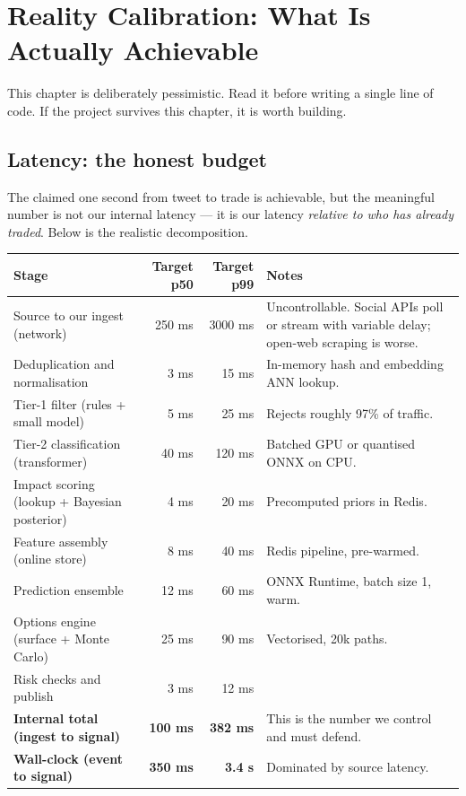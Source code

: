 \chapter{Reality Calibration: What Is Actually Achievable}
\label{ch:reality}

This chapter is deliberately pessimistic. Read it before writing a single line
of code. If the project survives this chapter, it is worth building.

\section{Latency: the honest budget}

The claimed one second from tweet to trade is achievable, but the meaningful
number is not our internal latency --- it is our latency \emph{relative to who
has already traded}. Below is the realistic decomposition.

\begin{longtable}{@{}p{5.4cm}rrp{5.0cm}@{}}
\toprule
\textbf{Stage} & \textbf{Target p50} & \textbf{Target p99} & \textbf{Notes}\\
\midrule
Source to our ingest (network) & 250 ms & 3000 ms & Uncontrollable. Social APIs
poll or stream with variable delay; open-web scraping is worse.\\
Deduplication and normalisation & 3 ms & 15 ms & In-memory hash and embedding
ANN lookup.\\
Tier-1 filter (rules + small model) & 5 ms & 25 ms & Rejects roughly 97\% of
traffic.\\
Tier-2 classification (transformer) & 40 ms & 120 ms & Batched GPU or quantised
ONNX on CPU.\\
Impact scoring (lookup + Bayesian posterior) & 4 ms & 20 ms & Precomputed
priors in Redis.\\
Feature assembly (online store) & 8 ms & 40 ms & Redis pipeline, pre-warmed.\\
Prediction ensemble & 12 ms & 60 ms & ONNX Runtime, batch size 1, warm.\\
Options engine (surface + Monte Carlo) & 25 ms & 90 ms & Vectorised, 20k paths.\\
Risk checks and publish & 3 ms & 12 ms & \\
\midrule
\textbf{Internal total (ingest to signal)} & \textbf{100 ms} & \textbf{382 ms}
& This is the number we control and must defend.\\
\textbf{Wall-clock (event to signal)} & \textbf{350 ms} & \textbf{3.4 s}
& Dominated by source latency.\\
\bottomrule
\end{longtable}

